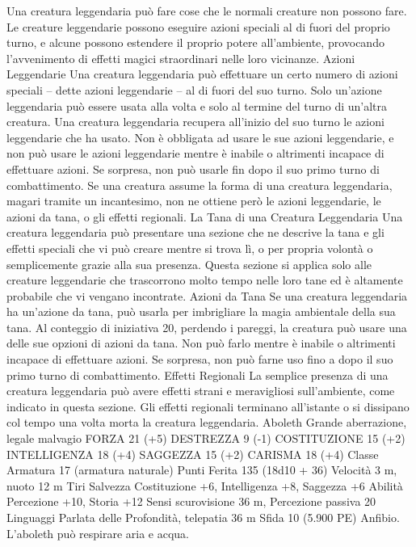 \begin{multicols}{2}
Una creatura leggendaria può fare cose che le normali
creature non possono fare. Le creature leggendarie
possono eseguire azioni speciali al di fuori del proprio
turno, e alcune possono estendere il proprio potere
all’ambiente, provocando l’avvenimento di effetti magici
straordinari nelle loro vicinanze.
Azioni Leggendarie
Una creatura leggendaria può effettuare un certo
numero di azioni speciali – dette azioni leggendarie – al
di fuori del suo turno. Solo un’azione leggendaria può
essere usata alla volta e solo al termine del turno di
un’altra creatura. Una creatura leggendaria recupera
all’inizio del suo turno le azioni leggendarie che ha
usato. Non è obbligata ad usare le sue azioni
leggendarie, e non può usare le azioni leggendarie
mentre è inabile o altrimenti incapace di effettuare
azioni. Se sorpresa, non può usarle fin dopo il suo
primo turno di combattimento.
Se una creatura assume la forma di una creatura
leggendaria, magari tramite un incantesimo, non ne
ottiene però le azioni leggendarie, le azioni da tana, o
gli effetti regionali.
La Tana di una Creatura
Leggendaria
Una creatura leggendaria può presentare una sezione
che ne descrive la tana e gli effetti speciali che vi può
creare mentre si trova lì, o per propria volontà o
semplicemente grazie alla sua presenza. Questa
sezione si applica solo alle creature leggendarie che
trascorrono molto tempo nelle loro tane ed è altamente
probabile che vi vengano incontrate.
Azioni da Tana
Se una creatura leggendaria ha un’azione da tana, può
usarla per imbrigliare la magia ambientale della sua
tana. Al conteggio di iniziativa 20, perdendo i pareggi,
la creatura può usare una delle sue opzioni di azioni da
tana. Non può farlo mentre è inabile o altrimenti
incapace di effettuare azioni. Se sorpresa, non può
farne uso fino a dopo il suo primo turno di
combattimento.
Effetti Regionali
La semplice presenza di una creatura leggendaria può
avere effetti strani e meravigliosi sull’ambiente, come
indicato in questa sezione. Gli effetti regionali
terminano all’istante o si dissipano col tempo una volta
morta la creatura leggendaria.
Aboleth
Grande aberrazione, legale malvagio
FORZA 21 (+5)
DESTREZZA 9 (-1)
COSTITUZIONE 15 (+2)
INTELLIGENZA 18 (+4)
SAGGEZZA 15 (+2)
CARISMA 18 (+4)
Classe Armatura 17 (armatura naturale)
Punti Ferita 135 (18d10 + 36)
Velocità 3 m, nuoto 12 m
Tiri Salvezza Costituzione +6, Intelligenza +8, Saggezza +6
Abilità Percezione +10, Storia +12
Sensi scurovisione 36 m, Percezione passiva 20
Linguaggi Parlata delle Profondità, telepatia 36 m
Sfida 10 (5.900 PE)
Anfibio. L’aboleth può respirare aria e acqua.

\end{multicols}
